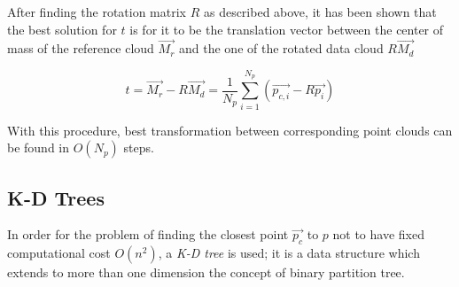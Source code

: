 After finding the rotation matrix $R$ as described above, it has been shown that the best solution for $t$
is for it to be the translation vector between the center of mass of the
reference cloud $\vec{M_{r}}$ and the one of the rotated
data cloud $R\vec{M_d}$ 

\begin{equation}
  t = \vec{M_r}-R\vec{M_d} =  \frac{1}{N_p}\sum_{i=1}^{N_p}\left(\vec{p_{c,i}}-R\vec{p_{i}}\right) 
\end{equation}

With this procedure, best transformation between corresponding point clouds can
be found in $O(N_p)$ steps.


\subsection{K-D Trees} \label{kdtree}
In order for the problem of finding the closest point $\vec{p_c}$ to $p$ not to
have fixed computational cost $O(n^2)$, a \emph{K-D tree} is used; it is
a data structure which extends to more than one dimension the concept of binary
partition tree.
